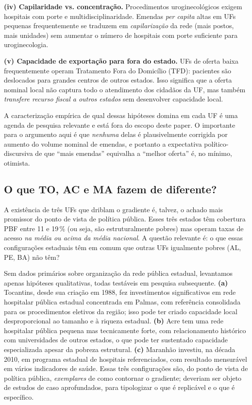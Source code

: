 \documentclass[12pt,a4paper,oneside]{article}
\begin{document}
\textbf{(iv) Capilaridade vs. concentração.} Procedimentos
uroginecológicos exigem hospitais com porte e
multidisciplinaridade. Emendas \textit{per capita} altas em UFs
pequenas frequentemente se traduzem em \textit{capilarização}
da rede (mais postos, mais unidades) sem aumentar o número de
hospitais com porte suficiente para uroginecologia.

\textbf{(v) Capacidade de exportação para fora do estado.}
UFs de oferta baixa frequentemente operam Tratamento Fora do
Domicílio (TFD): pacientes são deslocados para grandes centros
de outros estados. Isso significa que a oferta nominal local
não captura todo o atendimento dos cidadãos da UF, mas também
\textit{transfere recurso fiscal a outros estados} sem
desenvolver capacidade local.

A caracterização empírica de qual dessas hipóteses domina em
cada UF é uma agenda de pesquisa relevante e está fora do
escopo deste paper. O importante para o argumento aqui é que
\textit{nenhuma} delas é plausivelmente corrigida por aumento
do volume nominal de emendas, e portanto a expectativa
político-discursiva de que ``mais emendas'' equivalha a
``melhor oferta'' é, no mínimo, otimista.

\subsection{O que TO, AC e MA fazem de diferente?}

A existência de três UFs que driblam o gradiente é, talvez, o
achado mais promissor do ponto de vista de política pública.
Esses três estados têm cobertura PBF entre 11 e 19\,\% (ou
seja, são estruturalmente pobres) mas operam taxas de acesso
\textit{na média ou acima da média nacional}. A questão
relevante é: o que essas configurações estaduais têm em comum
que outras UFs igualmente pobres (AL, PE, BA) não têm?

Sem dados primários sobre organização da rede pública
estadual, levantamos apenas hipóteses qualitativas, todas
testáveis em pesquisa subsequente. \textbf{(a)} Tocantins,
desde sua criação em 1988, fez investimentos significativos em
rede hospitalar pública estadual concentrada em Palmas, com
referência consolidada para os procedimentos eletivos da região;
isso pode ter criado capacidade local desproporcional ao
tamanho e à riqueza estadual. \textbf{(b)} Acre tem uma rede
hospitalar pública pequena mas tecnicamente forte, com
relacionamento histórico com universidades de outros estados,
o que pode ter sustentado capacidade especializada apesar da
pobreza estrutural. \textbf{(c)} Maranhão investiu, na década
2010, em programa estadual de hospitais
referenciados, com resultado mensurável em vários indicadores
de saúde. Essas três configurações são, do ponto de vista de
política pública, \textit{exemplares} de como contornar o
gradiente; deveriam ser objeto de estudos de caso aprofundados,
para tipologizar o que é replicável e o que é específico.
\end{document}
